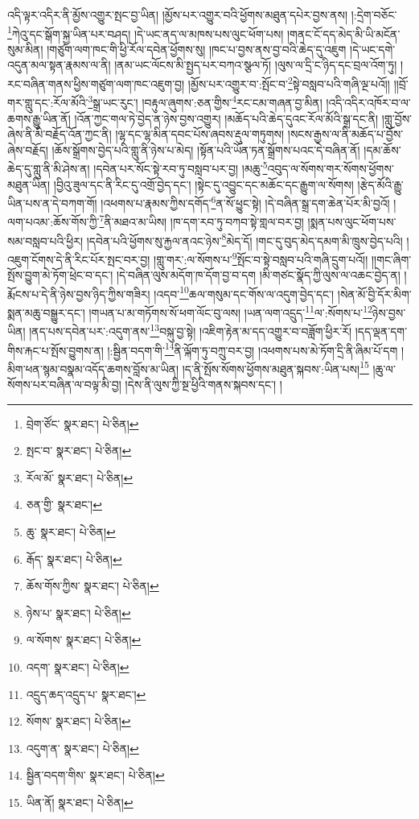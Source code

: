 འདི་ལྟར་འདིར་ནི་མྱོས་འགྱུར་སྤང་བྱ་ཡིན། །མྱོས་པར་འགྱུར་བའི་ཕྱོགས་མཐུན་དཔེར་བྱས་ནས། །:དྲེག་བཅོང་\footnote{བྲེག་ཙོང་  སྣར་ཐང་།  པེ་ཅིན། }ཀེའུ་དང་སྒོག་སྐྱ་ཡིན་པར་བཤད། །དེ་ཡང་ནད་ལ་མཁས་པས་ལུང་ཕོག་པས། །གནང་ངོ་དད་མེད་མི་ཡི་མངོན་སུམ་མིན། །གཙུག་ལག་ཁང་གི་ཕྱི་རོལ་དབེན་ཕྱོགས་སུ། །ཁང་པ་བྱས་ནས་བྱ་བའི་ཆེད་དུ་འཇུག །དེ་ཡང་དགེ་འདུན་མལ་སྟན་རྣམས་ལ་ནི། །ནམ་ཡང་ལོངས་མི་སྤྱད་པར་བཀའ་སྩལ་ཏོ། །ལུས་ལ་དྲི་ང་ཉིད་དང་བྲལ་འོག་ཏུ། །རང་བཞིན་གནས་ཕྱིས་གཙུག་ལག་ཁང་འཇུག་བྱ། །མྱོས་པར་འགྱུར་བ་:སྤོང་བ་\footnote{སྤང་བ་  སྣར་ཐང་།  པེ་ཅིན། }སྟེ་བསླབ་པའི་གཞི་ལྔ་པའོ།། །།བྲོ་གར་གླུ་དང་:རོལ་མོའི་\footnote{རོལ་མོ་  སྣར་ཐང་།  པེ་ཅིན། }སྒྲ་ཡང་རུང་། །བརྟུལ་ཞུགས་:ཅན་གྱིས་\footnote{ཅན་གྱི་  སྣར་ཐང་། }རང་ངམ་གཞན་བྱ་མིན། །འདི་འདིར་འཁོར་བ་ལ་ཆགས་རྒྱུ་ཡིན་ནོ། །འོན་ཀྱང་གལ་ཏེ་བྱེད་ན་ཉེས་བྱས་འགྱུར། །མཆོད་པའི་ཆེད་དུའང་རོལ་མོའི་སྒྲ་དང་ནི། །གླུ་བྱོས་ཞེས་ནི་མི་བརྗོད་འོན་ཀྱང་ནི། །ལྷ་དང་ལྷ་མིན་དབང་པོས་ཞབས་རྡུལ་གཏུགས། །སངས་རྒྱས་ལ་ནི་མཆོད་པ་བྱོས་ཞེས་བརྗོད། །ཆོས་སྒྲོགས་བྱེད་པའི་གླུ་ནི་ཉེས་པ་མེད། །སྟོན་པའི་ཡོན་ཏན་སྒྲོགས་པའང་དེ་བཞིན་ནོ། །དམ་ཆོས་ཆེད་དུ་གླུ་ནི་མི་ཤེས་ན། །དབེན་པར་སོང་སྟེ་རབ་ཏུ་བསླབ་པར་བྱ། །མཆུ་\footnote{ཆུ་  སྣར་ཐང་།  པེ་ཅིན། }འབུད་ལ་སོགས་གར་སོགས་ཕྱོགས་མཐུན་ཡིན། །བྱིའུ་ཟུལ་དང་ནི་རིང་དུ་འགྲོ་བྱེད་དང་། །སྟེང་དུ་འབྱུང་དང་མཆོང་དང་རྒྱུག་ལ་སོགས། །རྩེད་མོའི་རྒྱུ་ཡིན་པས་ན་དེ་བཀག་གོ། །འཕགས་པ་རྣམས་ཀྱིས་དགོད་\footnote{རྒོད་  སྣར་ཐང་།  པེ་ཅིན། }ན་སོ་ཕྱུང་སྟེ། །དེ་བཞིན་སྒྲ་དག་ཆེན་པོར་མི་བྱའོ། །ལག་པའམ་:ཆོས་གོས་ཀྱི་\footnote{ཆོས་གོས་ཀྱིས་  སྣར་ཐང་།  པེ་ཅིན། }ནི་མཐའ་མ་ཡིས། །ཁ་དག་རབ་ཏུ་བཀབ་སྟེ་གླལ་བར་བྱ། །སྨན་པས་ལུང་ཕོག་པས་སམ་བསླབ་པའི་ཕྱིར། །དབེན་པའི་ཕྱོགས་སུ་རྐྱལ་ནའང་ཉེས་\footnote{ཉེས་པ་  སྣར་ཐང་།  པེ་ཅིན། }མེད་དོ། །གང་དུ་བུད་མེད་དམག་མི་ཁྲུས་བྱེད་པའི། །འཇུག་ངོགས་དེ་ནི་རིང་པོར་སྤང་བར་བྱ། །གླུ་གར་:ལ་སོགས་པ་\footnote{ལ་སོགས་  སྣར་ཐང་།  པེ་ཅིན། }སྤོང་བ་སྟེ་བསླབ་པའི་གཞི་དྲུག་པའོ།། །།གང་ཞིག་སྤོས་བྱུག་མེ་ཏོག་ཕྲེང་བ་དང་། །དེ་བཞིན་ལུས་མདོག་ཁ་དོག་བྱ་བ་དག །མི་གཙང་སྣོད་ཀྱི་ལུས་ལ་འཆང་བྱེད་ན། །རྨོངས་པ་དེ་ནི་ཉེས་བྱས་ཉིད་ཀྱིས་གཟིར། །འདབ་\footnote{འདག་  སྣར་ཐང་།  པེ་ཅིན། }ཆལ་གསུམ་དང་གོས་ལ་འདུག་བྱེད་དང་། །སེན་མོ་བྱི་དོར་མིག་སྨན་མཆུ་བསྒྱུར་དང་། །གཡན་པ་མ་གཏོགས་སོ་ཕག་ལོང་བུ་ལས། །ཡན་ལག་འདྲུད་\footnote{འདྲུད་ཆད་འདྲུད་པ་  སྣར་ཐང་། }ལ་:སོགས་པ་\footnote{སོགས་  སྣར་ཐང་།  པེ་ཅིན། }ཉེས་བྱས་ཡིན། །ནད་པས་དབེན་པར་:འདུག་ནས་\footnote{འདུག་ན་  སྣར་ཐང་།  པེ་ཅིན། }བསྐུ་བྱ་སྟེ། །འཇིག་རྟེན་མ་དད་འགྱུར་བ་བཟློག་ཕྱིར་རོ། །དད་ལྡན་དག་གིས་རྐང་པ་སྤོས་བྱུགས་ན། །:སྦྱིན་བདག་གི་\footnote{སྦྱིན་བདག་གིས་  སྣར་ཐང་།  པེ་ཅིན། }ནི་ལྐོག་ཏུ་བཀྲུ་བར་བྱ། །འཕགས་པས་མེ་ཏོག་དྲི་ནི་ཞིམ་པོ་དག །མིག་ཕན་སྙམ་བསྣམ་འདོད་ཆགས་བློས་མ་ཡིན། །ད་ནི་སྤོས་སོགས་ཕྱོགས་མཐུན་སྐབས་:ཡིན་པས།\footnote{ཡིན་ནོ།  སྣར་ཐང་།  པེ་ཅིན། } །ཆུ་ལ་སོགས་པར་བཞིན་ལ་བལྟ་མི་བྱ། །དེས་ནི་ལུས་ཀྱི་སྔ་ཕྱིའི་གནས་སྐབས་དང་། །
